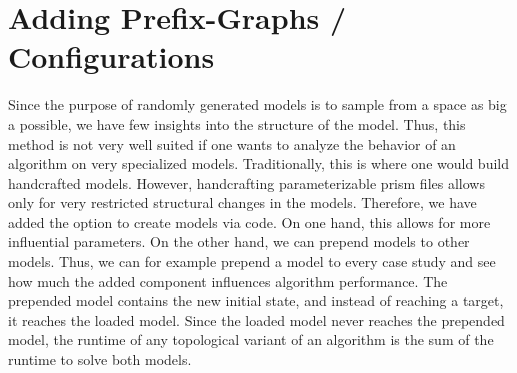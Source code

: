 \section{Adding Prefix-Graphs / Configurations}
Since the purpose of randomly generated models is to sample from a space as big a possible, we have few insights into the structure of the model.
Thus, this method is not very well suited if one wants to analyze the behavior of an algorithm on very specialized models. 
Traditionally, this is where one would build handcrafted models. 
However, handcrafting parameterizable prism files allows only for very restricted structural changes in the models. 
Therefore, we have added the option to create models via code. On one hand, this allows for more influential parameters.
On the other hand, we can prepend models to other models. 
Thus, we can for example prepend a model to every case study and see how much the added component influences algorithm performance.
The prepended model contains the new initial state, and instead of reaching a target, it reaches the loaded model.
Since the loaded model never reaches the prepended model, the runtime of any topological variant of an algorithm is the sum of the runtime to solve both models.



